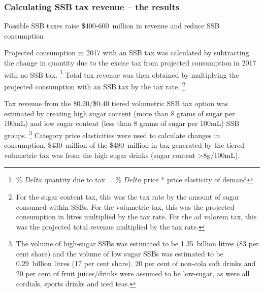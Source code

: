 \documentclass[embargoed]{grattan}
\begin{document}
\subsubsection{Calculating SSB tax revenue -- the results }\label{calculating-ssb-tax-revenue-the-results}

\begin{table}
\caption{Possible SSB taxes raise \$400-600~million in revenue and reduce SSB consumption}



\end{table}

Projected consumption in 2017 with an SSB tax was calculated by subtracting the change in quantity due to the excise tax from projected consumption in 2017 with no SSB tax.%
\footnote{\% $Delta$ quantity due to tax = \% $Delta$ price * price elasticity of demand} Total tax revenue was then obtained by multiplying the projected consumption with an SSB tax by the tax rate.%
\footnote{For the sugar content tax, this was the tax rate by the amount of sugar consumed within SSBs.
For the volumetric tax, this was the projected consumption in litres multiplied by the tax rate.
For the ad valorem tax, this was the projected total revenue multiplied by the tax rate.}

Tax revenue from the \$0.20/\$0.40 tiered volumetric SSB tax option was estimated by creating high sugar content (more than 8 grams of sugar per 100mL) and low sugar content (less than 8 grams of sugar per 100mL) SSB groups.%
\footnote{The volume of high-sugar SSBs was estimated to be 1.35~billion litres (83 per cent share) and the volume of low sugar SSBs was estimated to be 0.29~billion litres (17 per cent share). 20 per cent of non-cola soft drinks and 20 per cent of fruit juices/drinks were assumed to be low-sugar, as were all cordials, sports drinks and iced teas.} Category price elasticities were used to calculate changes in consumption. \$430~million of the \$480~million in tax generated by the tiered volumetric tax was from the high sugar drinks (sugar content \textgreater{}8g/100mL).
\end{document}
